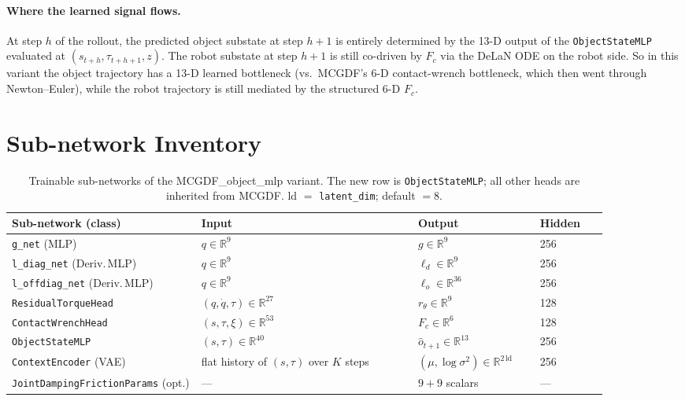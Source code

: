 \documentclass[11pt]{article}
\begin{document}
\paragraph{Where the learned signal flows.}
At step $h$ of the rollout, the predicted object substate at step
$h+1$ is entirely determined by the 13-D output of the
\texttt{ObjectStateMLP} evaluated at $(s_{t+h}, \tau_{t+h+1}, z)$.
The robot substate at step $h+1$ is still co-driven by $F_c$ via the
DeLaN ODE on the robot side.  So in this variant the object trajectory
has a 13-D learned bottleneck (vs.\ MCGDF's 6-D contact-wrench
bottleneck, which then went through Newton--Euler), while the robot
trajectory is still mediated by the structured 6-D $F_c$.

\section{Sub-network Inventory}

\begin{table}[h]
\centering
\small
\begin{tabular}{p{0.28\linewidth} p{0.32\linewidth} p{0.18\linewidth} p{0.10\linewidth}}
\toprule
Sub-network (class)              & Input                                  & Output                       & Hidden \\
\midrule
\texttt{g\_net} (MLP)            & $q \in \mathbb{R}^9$                  & $g \in \mathbb{R}^9$         & 256    \\
\texttt{l\_diag\_net} (Deriv.\,MLP) & $q \in \mathbb{R}^9$              & $\ell_d \in \mathbb{R}^9$    & 256    \\
\texttt{l\_offdiag\_net} (Deriv.\,MLP) & $q \in \mathbb{R}^9$           & $\ell_o \in \mathbb{R}^{36}$ & 256    \\
\texttt{ResidualTorqueHead}      & $(q,\dot q,\tau) \in \mathbb{R}^{27}$ & $r_\theta \in \mathbb{R}^9$  & 128    \\
\texttt{ContactWrenchHead}       & $(s,\tau,\xi) \in \mathbb{R}^{53}$    & $F_c \in \mathbb{R}^6$       & 128    \\
\texttt{ObjectStateMLP}          & $(s,\tau) \in \mathbb{R}^{40}$        & $\hat o_{t+1} \in \mathbb{R}^{13}$ & 256 \\
\texttt{ContextEncoder} (VAE)    & flat history of $(s,\tau)$ over $K$ steps & $(\mu,\log\sigma^2) \in \mathbb{R}^{2\,\mathrm{ld}}$ & 256 \\
\texttt{JointDampingFrictionParams} (opt.) & ---                         & $9+9$ scalars                & ---    \\
\bottomrule
\end{tabular}
\caption{Trainable sub-networks of the MCGDF\_object\_mlp variant.
The new row is \texttt{ObjectStateMLP}; all other heads are
inherited from MCGDF.  ld $=$ \texttt{latent\_dim}; default $=8$.}
\label{tab:om-subnets}
\end{table}
\end{document}
